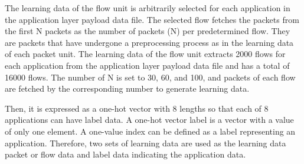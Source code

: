 The learning data of the flow unit is arbitrarily selected for each application in the application layer payload data file.
The selected flow fetches the packets from the first N packets as the number of packets (N) per predetermined flow.
They are packets that have undergone a preprocessing process as in the learning data of each packet unit.
The learning data of the flow unit extracts 2000 flows for each application from the application layer payload data file and has a total of 16000 flows.
The number of N is set to 30, 60, and 100, and packets of each flow are fetched by the corresponding number to generate learning data.

Then, it is expressed as a one-hot vector with 8 lengths so that each of 8 applications can have label data.
A one-hot vector label is a vector with a value of only one element.
A one-value index can be defined as a label representing an application.
Therefore, two sets of learning data are used as the learning data packet or flow data and label data indicating the application data.